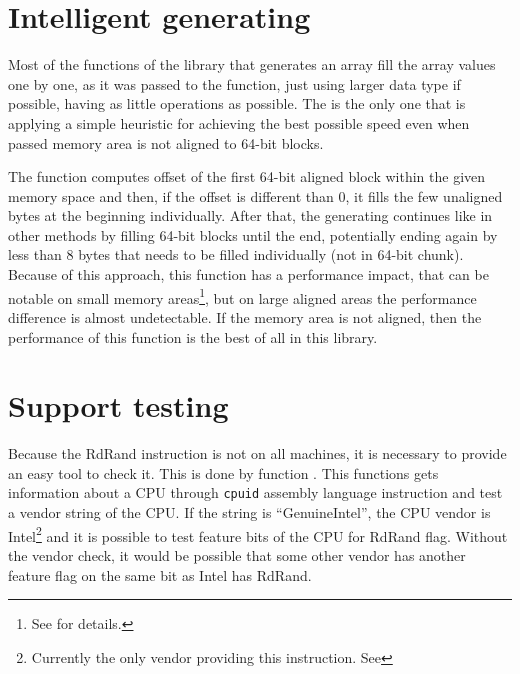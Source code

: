 \section{Intelligent generating}
Most of the functions of the library that generates an array fill the array values one by one, as it was passed to the function, just using larger data type if possible, having as little operations as possible. The  is the only one that is applying a simple heuristic for achieving the best possible speed even when passed memory area is not aligned to 64-bit blocks.

The function computes offset of the first 64-bit aligned block within the given memory space and then, if the offset is different than 0, it fills the few unaligned bytes at the beginning individually. After that, the generating continues like in other methods by filling 64-bit blocks until the end, potentially ending again by less than 8 bytes that needs to be filled individually (not in 64-bit chunk). Because of this approach, this function has a performance impact, that can be notable on small memory areas\footnote{See  for details.}, but on large aligned areas the performance difference is almost undetectable. If the memory area is not aligned, then the performance of this function is the best of all in this library.


\section{Support testing}
Because the RdRand instruction is not on all machines, it is necessary to provide an easy tool to check it. This is done by function . This functions gets information about a CPU through {\tt cpuid} assembly language instruction and test a vendor string of the CPU. If the string is ``GenuineIntel'', the CPU vendor is Intel\footnote{Currently the only vendor providing this instruction. See } and it is possible to test feature bits of the CPU for RdRand flag. Without the vendor check, it would be possible that some other vendor has another feature flag on the same bit as Intel has RdRand.



